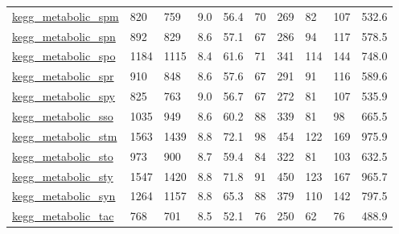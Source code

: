 \begin{longtable}{llllllllll}
 \href{http://santafe.edu/~aaronc/data/kegg2006_metabolic.zip}{kegg\_metabolic\_spm}                                          & 820        & 759   & 9.0    & 56.4   & 70    & 269    & 82     & 107    & 532.6   \\
 \href{http://santafe.edu/~aaronc/data/kegg2006_metabolic.zip}{kegg\_metabolic\_spn}                                          & 892        & 829   & 8.6    & 57.1   & 67    & 286    & 94     & 117    & 578.5   \\
 \href{http://santafe.edu/~aaronc/data/kegg2006_metabolic.zip}{kegg\_metabolic\_spo}                                          & 1184       & 1115  & 8.4    & 61.6   & 71    & 341    & 114    & 144    & 748.0   \\
 \href{http://santafe.edu/~aaronc/data/kegg2006_metabolic.zip}{kegg\_metabolic\_spr}                                          & 910        & 848   & 8.6    & 57.6   & 67    & 291    & 91     & 116    & 589.6   \\
 \href{http://santafe.edu/~aaronc/data/kegg2006_metabolic.zip}{kegg\_metabolic\_spy}                                          & 825        & 763   & 9.0    & 56.7   & 67    & 272    & 81     & 107    & 535.9   \\
 \href{http://santafe.edu/~aaronc/data/kegg2006_metabolic.zip}{kegg\_metabolic\_sso}                                          & 1035       & 949   & 8.6    & 60.2   & 88    & 339    & 81     & 98     & 665.5   \\
 \href{http://santafe.edu/~aaronc/data/kegg2006_metabolic.zip}{kegg\_metabolic\_stm}                                          & 1563       & 1439  & 8.8    & 72.1   & 98    & 454    & 122    & 169    & 975.9   \\
 \href{http://santafe.edu/~aaronc/data/kegg2006_metabolic.zip}{kegg\_metabolic\_sto}                                          & 973        & 900   & 8.7    & 59.4   & 84    & 322    & 81     & 103    & 632.5   \\
 \href{http://santafe.edu/~aaronc/data/kegg2006_metabolic.zip}{kegg\_metabolic\_sty}                                          & 1547       & 1420  & 8.8    & 71.8   & 91    & 450    & 123    & 167    & 965.7   \\
 \href{http://santafe.edu/~aaronc/data/kegg2006_metabolic.zip}{kegg\_metabolic\_syn}                                          & 1264       & 1157  & 8.8    & 65.3   & 88    & 379    & 110    & 142    & 797.5   \\
 \href{http://santafe.edu/~aaronc/data/kegg2006_metabolic.zip}{kegg\_metabolic\_tac}                                          & 768        & 701   & 8.5    & 52.1   & 76    & 250    & 62     & 76     & 488.9   \\

\end{longtable}
